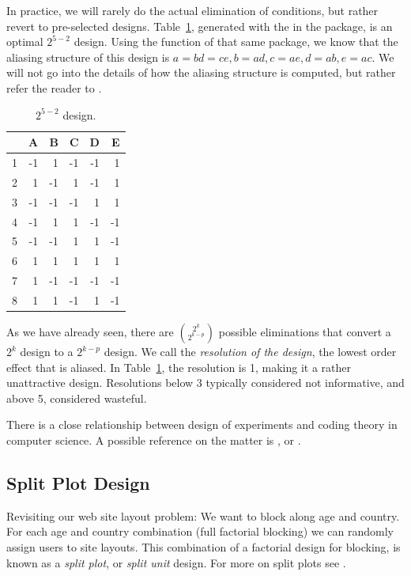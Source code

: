 In practice, we will rarely do the actual elimination of conditions, but rather revert to pre-selected designs. 
Table~\ref{tab:partial_factorial_ii}, generated with the  in the  \R package, is an optimal $2^{5-2}$ design.
Using the  function of that same package, we know that the aliasing structure of this design is
$a=bd=ce, b=ad, c=ae, d=ab, e=ac$.
We will not go into the details of how the aliasing structure is computed, but rather refer the reader to \cite{cox_theory_2000}.
\begin{table}[ht]
\centering
\begin{tabular}{rrrrrr}
  \hline
 & A & B & C & D & E \\ 
  \hline
1 & -1 & 1 & -1 & -1 & 1 \\ 
  2 & 1 & -1 & 1 & -1 & 1 \\ 
  3 & -1 & -1 & -1 & 1 & 1 \\ 
  4 & -1 & 1 & 1 & -1 & -1 \\ 
  5 & -1 & -1 & 1 & 1 & -1 \\ 
  6 & 1 & 1 & 1 & 1 & 1 \\ 
  7 & 1 & -1 & -1 & -1 & -1 \\ 
  8 & 1 & 1 & -1 & 1 & -1 \\ 
   \hline
\end{tabular}
\caption[Fractional Factorial Design]{$2^{5-2}$ design.}
\label{tab:partial_factorial_ii}
\end{table}


\begin{definition}
As we have already seen, there are $\binom{2^k}{2^{k-p}}$ possible eliminations that convert a $2^k$ design to a $2^{k-p}$ design.
We call the \emph{resolution of the design}, the lowest order effect that is aliased. 
In Table~\ref{tab:partial_factorial_ii}, the resolution is 1, making it a rather unattractive design. 
Resolutions below 3 typically considered not informative, and above 5, considered wasteful.
\end{definition}


\begin{extra}
There is a close relationship between design of experiments and coding theory in computer science. 
A possible reference on the matter is \cite{hill_first_1986}, or \cite{hedayat_orthogonal_1999}.
\end{extra}



\subsection{Split Plot Design}
\label{sec:split_plot}
Revisiting our web site layout problem:
We want to block along age and country. 
For each age and country combination (full factorial blocking) we can randomly assign users to site layouts. 
This combination of a factorial design for blocking, is known as a \emph{split plot}, or \emph{split unit} design.
For more on split plots see \cite[Sec.6.4]{cox_theory_2000}.



